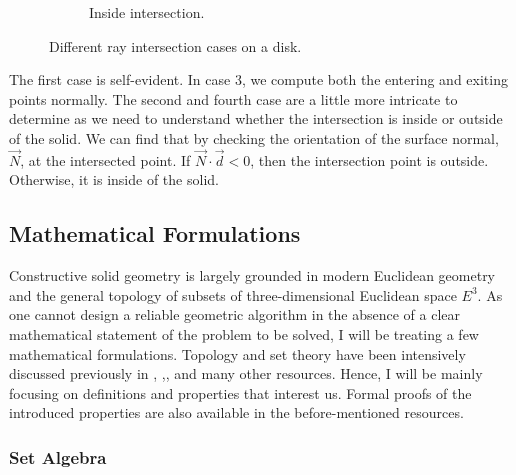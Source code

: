 \documentclass[a4paper,11pt,oneside]{article}
\begin{document}
\begin{figure}[ht]
\begin{subfigure}[b]{0.3\textwidth}
         \caption{Inside intersection.}
         \label{sec3.1:inside-intersection}
     \end{subfigure}
        \caption{Different ray intersection cases on a disk.}
        \label{sec3.1:intersection-cases}
\end{figure}


The first case is self-evident. In case 3, we compute both the entering and exiting points normally. The second and fourth case are a little more intricate to determine as we need to understand whether the intersection is inside or outside of the solid. We can find that by checking the orientation of the surface normal, $\vec{N}$, at the intersected point. If $\vec{N}\cdot\vec{d} < 0$, then the intersection point is outside. Otherwise, it is inside of the solid.

\subsection{Mathematical Formulations}
  
Constructive solid geometry is largely grounded in modern Euclidean geometry and the general topology of subsets of three-dimensional Euclidean space $E^3$. As one cannot design a reliable geometric algorithm in the absence of a clear mathematical statement of the problem to be solved, I will be treating a few mathematical formulations. Topology and set theory have been intensively discussed previously in \cite{Requicha1978MathematicalFO}, \cite{tilove1977a},\cite{lachlan_srebrny_zarach_1977}, and many other resources. Hence, I will be mainly focusing on definitions and properties that interest us. Formal proofs of the introduced properties are also available in the before-mentioned resources.
  
\subsubsection{Set Algebra}
  
\theoremstyle{definition}
\newtheorem{definition}{Definition}[section]
  
\theoremstyle{property}
\newtheorem{property}{Property}[section]
    
\theoremstyle{remark}
\newtheorem*{remark}{Remark}
      
\end{document}
